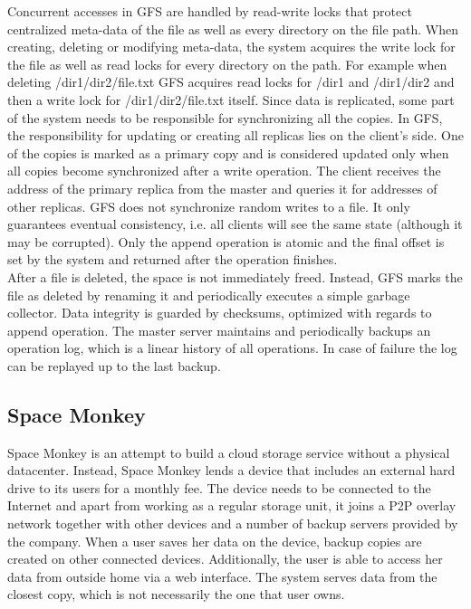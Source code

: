 \documentclass{pracamgren}
\begin{document}
Concurrent accesses in GFS are handled by read-write locks that protect centralized meta-data of the file as well as every directory on the file path. When creating, deleting or modifying meta-data, the system acquires the write lock for the file as well as read locks for every directory on the path. For example when deleting /dir1/dir2/file.txt GFS acquires read locks for /dir1 and /dir1/dir2 and then a write lock for /dir1/dir2/file.txt itself. Since data is replicated, some part of the system needs to be responsible for synchronizing all the copies. In GFS, the responsibility for updating or creating all replicas lies on the client's side. One of the copies is marked as a primary copy and is considered updated only when all copies become synchronized after a write operation. The client receives the address of the primary replica from the master and queries it for addresses of other replicas. GFS does not synchronize random writes to a file. It only guarantees eventual consistency, i.e. all clients will see the same state (although it may be corrupted). Only the append operation is atomic and the final offset is set by the system and returned after the operation finishes.\\

After a file is deleted, the space is not immediately freed. Instead, GFS marks the file as deleted by renaming it and periodically executes a simple garbage collector. Data integrity is guarded by checksums, optimized with regards to append operation. The master server maintains and periodically backups an operation log, which is a linear history of all operations. In case of failure the log can be replayed up to the last backup.\\

\subsection{Space Monkey}

Space Monkey \cite{space_monkey} is an attempt to build a cloud storage service without a physical datacenter. Instead, Space Monkey lends a device that includes an external hard drive to its users for a monthly fee. The device needs to be connected to the Internet and apart from working as a regular storage unit, it joins a P2P overlay network together with other devices and a number of backup servers provided by the company. When a user saves her data on the device, backup copies are created on other connected devices. Additionally, the user is able to access her data from outside home via a web interface. The system serves data from the closest copy, which is not necessarily the one that user owns.\\
\end{document}
